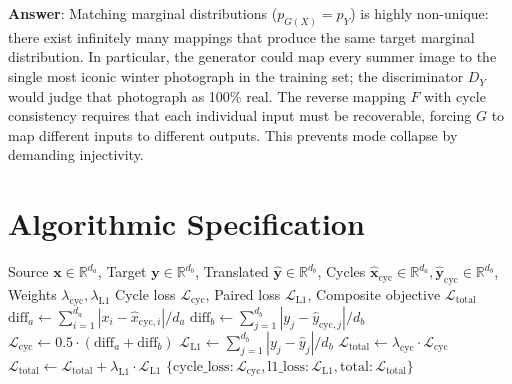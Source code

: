 \documentclass[11pt,a4paper]{article}
\theoremstyle{definition}
\begin{document}
\textbf{Answer}: Matching marginal distributions ($p_{G(X)} = p_Y$) is highly non-unique: there exist infinitely many mappings that produce the same target marginal distribution. In particular, the generator could map every summer image to the single most iconic winter photograph in the training set; the discriminator $D_Y$ would judge that photograph as 100\% real. The reverse mapping $F$ with cycle consistency requires that each individual input must be recoverable, forcing $G$ to map different inputs to different outputs. This prevents mode collapse by demanding injectivity.

\section{Algorithmic Specification}

\begin{algorithm}[H]
\caption{Conditional Image-to-Image GAN Structural Loss Evaluation}
\label{alg:cgan}
\begin{algorithmic}[1]
\Require Source $\mathbf{x} \in \mathbb{R}^{d_a}$, Target $\mathbf{y} \in \mathbb{R}^{d_b}$, Translated $\hat{\mathbf{y}} \in \mathbb{R}^{d_b}$, Cycles $\hat{\mathbf{x}}_{\text{cyc}} \in \mathbb{R}^{d_a}, \hat{\mathbf{y}}_{\text{cyc}} \in \mathbb{R}^{d_b}$, Weights $\lambda_{\text{cyc}}, \lambda_{\text{L1}}$
\Ensure Cycle loss $\mathcal{L}_{\text{cyc}}$, Paired loss $\mathcal{L}_{\text{L1}}$, Composite objective $\mathcal{L}_{\text{total}}$
\State $\text{diff}_a \gets \sum_{i=1}^{d_a} |x_i - \hat{x}_{\text{cyc}, i}| / d_a$
\State $\text{diff}_b \gets \sum_{j=1}^{d_b} |y_j - \hat{y}_{\text{cyc}, j}| / d_b$
\State $\mathcal{L}_{\text{cyc}} \gets 0.5 \cdot (\text{diff}_a + \text{diff}_b)$
\State $\mathcal{L}_{\text{L1}} \gets \sum_{j=1}^{d_b} |y_j - \hat{y}_j| / d_b$
\State $\mathcal{L}_{\text{total}} \gets \lambda_{\text{cyc}} \cdot \mathcal{L}_{\text{cyc}}$
    \State $\mathcal{L}_{\text{total}} \gets \mathcal{L}_{\text{total}} + \lambda_{\text{L1}} \cdot \mathcal{L}_{\text{L1}}$
\EndIf
\State \Return $\{\text{cycle\_loss}: \mathcal{L}_{\text{cyc}}, \text{l1\_loss}: \mathcal{L}_{\text{L1}}, \text{total}: \mathcal{L}_{\text{total}}\}$
\end{algorithmic}
\end{algorithm}
\end{document}

